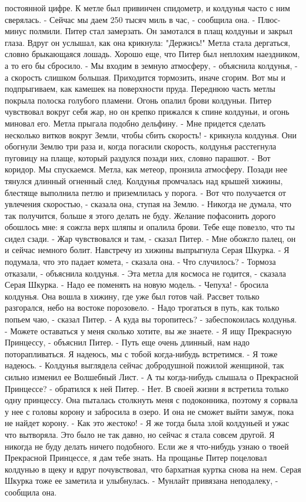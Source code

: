 постоянной цифре. К метле был привинчен спидометр, и колдунья часто с 
ним сверялась.
    - Сейчас мы даем 250 тысяч миль в час, - сообщила она. - Плюс-
минус полмили.
    Питер стал замерзать. Он замотался в плащ колдуньи и закрыл глаза.
    Вдруг он услышал, как она крикнула: "Держись!" Метла стала 
дергаться, словно брыкающаяся лошадь. Хорошо еще, что Питер был 
неплохим наездником, а то его бы сбросило.
    - Мы входим в земную атмосферу, - объяснила колдунья, - а скорость 
слишком большая. Приходится тормозить, иначе сгорим. Вот мы и 
подпрыгиваем, как камешек на поверхности пруда.
    Переднюю часть метлы покрыла полоска голубого пламени. Огонь 
опалил брови колдуньи. Питер чувствовал вокруг себя жар, но он крепко 
прижался к спине колдуньи, и огонь миновал его. Метла прыгала подобно 
дельфину.
    - Мне придется сделать несколько витков вокруг Земли, чтобы сбить 
скорость! - крикнула колдунья.
    Они обогнули Землю три раза и, когда погасили скорость, колдунья 
расстегнула пуговицу на плаще, который раздулся позади них, словно 
парашют.
    - Вот коридор. Мы спускаемся.
    Метла, как метеор, пронзила атмосферу. Позади нее тянулся длинный 
огненный след. Колдунья промчалась над крышей хижины, блестяще 
выполнила петлю и приземлилась у порога.
    - Вот что получается от увлечения скоростью, - сказала она, ступая 
на Землю. - Никогда не думала, что так получится, больше я этого 
делать не буду. Желание пофасонить дорого обошлось мне: я сожгла верх 
шляпы и опалила брови. Тебе еще повезло, что ты сидел сзади.
    - Жар чувствовался и там, - сказал Питер. - Мне обожгло палец, он 
и сейчас немного болит.
    Навстречу из хижины выпрыгнула Серая Шкурка.
    - Я подумала, что это падает комета, - сказала она. - Что 
случилось?
    - Тормоза отказали, - объяснила колдунья.
    - Эта метла для космоса не годится, - сказала Серая Шкурка. - Надо 
ее поменять на новую модель.
    - Чепуха! - бросила колдунья. Она вошла в хижину, где уже был 
готов чай.
    Рассвет только разгорался, небо на востоке порозовело.
    - Надо трогаться в путь, как только попьем чаю, - сказал Питер.
    - А куда вы торопитесь? - забеспокоилась колдунья. - Можете 
оставаться у меня сколько хотите, вы же знаете.
    - Я ищу Прекрасную Принцессу, - объяснил Питер. - Путь еще очень 
длинный, нам надо поторапливаться. Я надеюсь, мы с тобой когда-нибудь 
встретимся.
    - Я тоже надеюсь. - Колдунья выглядела сейчас добродушной пожилой 
женщиной, так сильно изменил ее Волшебный Лист.
    - А ты когда-нибудь слышала о Прекрасной Принцессе? - обратился к 
ней Питер.
    - Нет. В своей жизни я встретила только одну принцессу. Она 
пыталась столкнуть меня с подоконника, поэтому я сорвала у нее с 
головы корону и забросила в озеро. И она не сможет выйти замуж, пока 
не найдет корону.
    - Как это жестоко!
    - Я же тогда была злой колдуньей и ужас что вытворяла. Это было не 
так давно, но сейчас я стала совсем другой. Я никогда не буду делать 
ничего подобного. Если же я что-нибудь узнаю о твоей Прекрасной 
Принцессе, я дам тебе знать.
    На прощанье Питер поцеловал колдунью в щеку и вдруг почувствовал, 
что бархатная куртка снова на нем. Серая Шкурка тоже ее заметила и 
улыбнулась.
    - Мунлайт привязана неподалеку, - сообщила она.

